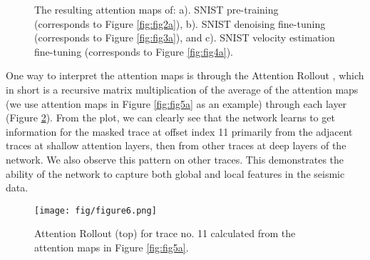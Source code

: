 \documentclass{article}
\begin{document}
\begin{figure}[h]
    \centering
    \caption{The resulting attention maps of: a). SNIST pre-training (corresponds to Figure \ref{fig:fig2a}), b). SNIST denoising fine-tuning (corresponds to Figure \ref{fig:fig3a}), and c). SNIST velocity estimation fine-tuning (corresponds to Figure \ref{fig:fig4a}).}
    \label{fig:fig5}
\end{figure}

One way to interpret the attention maps is through the Attention Rollout \cite{abnar2020quantifying}, which in short is a recursive matrix multiplication of the average of the attention maps (we use attention maps in Figure \ref{fig:fig5a} as an example) through each layer (Figure \ref{fig:fig6}). From the plot, we can clearly see that the network learns to get information for the masked trace at offset index 11 primarily from the adjacent traces at shallow attention layers, then from other traces at deep layers of the network. We also observe this pattern on other traces. This demonstrates the ability of the network to capture both global and local features in the seismic data.

\begin{figure}[h]
    \centering
    \texttt{[image: fig/figure6.png]}
    \caption{Attention Rollout (top) for trace no. 11 calculated from the attention maps in Figure \ref{fig:fig5a}.}
    \label{fig:fig6}
\end{figure}
\end{document}
